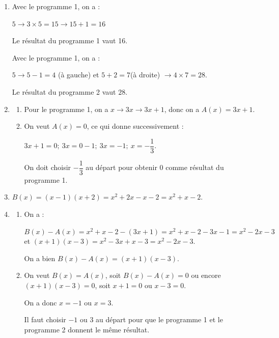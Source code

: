 \medskip

\begin{enumerate}
\item Avec le programme 1, on a :

$5 \to  3 \times 5 = 15 \to 15 + 1 = 16$

Le résultat du programme 1 vaut 16.
 
Avec le programme 1, on a :

$5 \to 5 - 1 = 4$ (à gauche) et  $5 + 2 = 7 $(à droite) $\to  4 \times 7 = 28$.

Le résultat du programme 2 vaut $28$.
\item 
	\begin{enumerate}
		\item Pour le programme 1, on a $x \to  3x \to  3x + 1$, donc on a
$A(x) = 3x + 1$.
		\item  On veut $A(x) = 0$, ce qui donne successivement :
		
$3x + 1 = 0 ;\: 3x = 0 - 1 ; \:3x = -1  ;\: x = - \dfrac{1}{3}$.

On doit choisir $- \dfrac{1}{3}$ au départ pour obtenir $0$ comme résultat du programme 1.
	\end{enumerate} 
\item  $B(x) = (x - 1)(x + 2) = x^2 + 2x - x - 2 = x^2 + x - 2$.
\item 
	\begin{enumerate}
		\item On a : 
		
$B(x) - A(x) = x^2 + x - 2 - (3x + 1) = x^2 + x - 2 - 3x - 1 = x^2 - 2x - 3$\\
et $(x + 1)(x - 3) = x^2 - 3x + x - 3 = x^2 - 2x - 3$.

On a bien $B(x) - A(x) = (x + 1)(x - 3)$.
		\item  On veut $B(x) = A(x)$, soit $B(x) - A(x) = 0$ ou encore
$(x + 1)(x - 3) = 0$, soit $x + 1 = 0$ ou $x - 3 = 0$.

On a donc $x = - 1$ ou $x = 3$.

Il faut choisir $- 1$ ou $3$ au départ pour que le programme 1 et le programme 2 donnent le même résultat. 
	\end{enumerate}
\end{enumerate}
